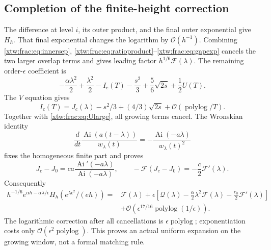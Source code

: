 \documentclass[11pt]{article}
\theoremstyle{remark}\newtheorem{remark}[theorem]{Remark}
\newcommand{\OO}{\mathcal O}
\newcommand{\Ai}{\operatorname{Ai}}
\newcommand{\FF}{\mathcal F}
\newcommand{\QQ}{\mathcal Q}
\begin{document}
\subsection{Completion of the finite-height correction}
The difference at level $i$, its outer product, and the final outer
exponential give $H_h$. That final exponential changes the logarithm by
$\OO(h^{-1})$. Combining \eqref{xtw:frac:eq:innersep},
\eqref{xtw:frac:eq:ratioproduct}--\eqref{xtw:frac:eq:gapexp} cancels the two larger overlap
terms and gives leading factor $h^{1/6}\FF(\lambda)$.
The remaining order-$\epsilon$ coefficient is
\[
 -\frac{\alpha\lambda^2}{2}+\frac{\lambda^2}{2}
 -I_c(T)-\frac{s^2}{3}+\frac56\sqrt{2s}+\frac12U(T).
\]
The $V$ equation gives
\begin{equation}\label{xtw:frac:eq:Ilarge}
 I_c(T)=J_c(\lambda)-s^2/3+(4/3)\sqrt{2s}
                                  +\OO(\operatorname{polylog}/T).
\end{equation}
Together with \eqref{xtw:frac:eq:Ularge}, all growing terms cancel.
The Wronskian identity
\[
 \frac{d}{dt}\frac{\Ai(a(t-\lambda))}{w_\lambda(t)}
          =-\frac{\Ai(-a\lambda)}{w_\lambda(t)^2}
\]
fixes the homogeneous finite part and proves
\begin{equation}\label{xtw:frac:eq:gauge}
 J_c-J_0=ca\frac{\Ai'(-a\lambda)}{\Ai(-a\lambda)},\qquad
 -\FF(J_c-J_0)=-\frac c2\FF'(\lambda).
\end{equation}
Consequently
\begin{equation}\label{xtw:frac:eq:windowcorrection}
 \begin{split}
 h^{-1/6}e^{\alpha h-\alpha\lambda/\epsilon}H_h(e^{\lambda\epsilon^2}/(eh))
  ={}&\FF(\lambda)+\epsilon\left[
       \QQ(\lambda)-\frac\alpha2\lambda^2\FF(\lambda)
                          -\frac{c_h}{2}\FF'(\lambda)\right]\\
   &+\OO(\epsilon^{17/16}\operatorname{polylog}(1/\epsilon)).
 \end{split}
\end{equation}
The logarithmic correction after all cancellations is
$\epsilon\operatorname{polylog}$; exponentiation costs only
$\OO(\epsilon^2\operatorname{polylog})$. This proves an actual uniform
expansion on the growing window, not a formal matching rule.
\end{document}
